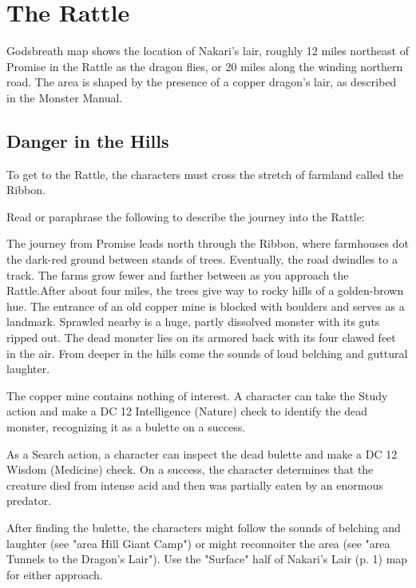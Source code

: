 \documentclass[letterpaper, 11pt, twocolumn]{dndbook}
\begin{document}
\section{The Rattle}



Godsbreath map shows the location of Nakari's lair, roughly 12 miles northeast of Promise in the Rattle as the dragon flies, or 20 miles along the winding northern road. The area is shaped by the presence of a copper dragon's lair, as described in the Monster Manual.

\subsection{Danger in the Hills}


To get to the Rattle, the characters must cross the stretch of farmland called the Ribbon.

Read or paraphrase the following to describe the journey into the Rattle:

\begin{DndReadAloud}
The journey from Promise leads north through the Ribbon, where farmhouses dot the dark-red ground between stands of trees. Eventually, the road dwindles to a track. The farms grow fewer and farther between as you approach the Rattle.After about four miles, the trees give way to rocky hills of a golden-brown hue. The entrance of an old copper mine is blocked with boulders and serves as a landmark. Sprawled nearby is a huge, partly dissolved monster with its guts ripped out. The dead monster lies on its armored back with its four clawed feet in the air. From deeper in the hills come the sounds of loud belching and guttural laughter.
\end{DndReadAloud}

The copper mine contains nothing of interest. A character can take the Study action and make a DC 12 Intelligence (Nature) check to identify the dead monster, recognizing it as a bulette on a success.

As a Search action, a character can inspect the dead bulette and make a DC 12 Wisdom (Medicine) check. On a success, the character determines that the creature died from intense acid and then was partially eaten by an enormous predator.

After finding the bulette, the characters might follow the sounds of belching and laughter (see "area Hill Giant Camp") or might reconnoiter the area (see "area Tunnels to the Dragon's Lair"). Use the "Surface" half of Nakari's Lair (p. 1) map for either approach.
\end{document}
